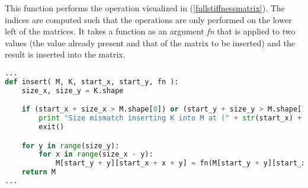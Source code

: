 This function performs the operation visualized in (\cref{fullstiffnessmatrix}).
The indices are computed such that the operations are only performed on the lower left of the matrices.
It takes a function as an argument \textit{fn} that is applied to two values (the value already present and that of the matrix to be inserted) and the result is inserted into the matrix. 

\begin{inconsolata}
\begin{minipage}{\linewidth}
\begin{lstlisting}[language=python]
...
def insert( M, K, start_x, start_y, fn ):
    size_x, size_y = K.shape

    if (start_x + size_x > M.shape[0]) or (start_y + size_y > M.shape[1]):
        print "Size mismatch inserting K into M at (" + str(start_x) + "," + str(start_y) + ")."
        exit()

    for y in range(size_y):
        for x in range(size_x - y):
            M[start_y + y][start_x + x + y] = fn(M[start_y + y][start_x + x + y], K[y][x + y])
    return M
...
\end{lstlisting}
\end{minipage}
\end{inconsolata}